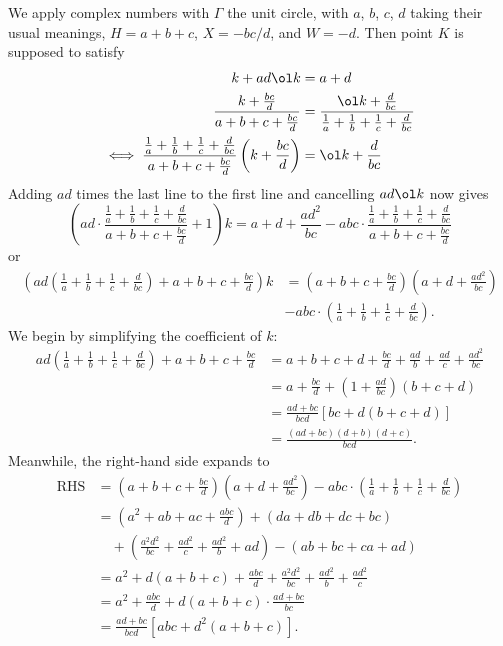 We apply complex numbers with $\Gamma$ the unit circle,
with $a$, $b$, $c$, $d$ taking their usual meanings,
$H = a+b+c$, $X = -bc/d$, and $W = -d$.
Then point $K$ is supposed to satisfy
\begin{align*}
  k + ad \ol k &= a+d \\
  \frac{k+\frac{bc}{d}}{a+b+c+\frac{bc}{d}}
    &= \frac{\ol k + \frac{d}{bc}}{\frac1a+\frac1b+\frac1c+\frac{d}{bc}} \\
  \iff \frac{\frac1a+\frac1b+\frac1c+\frac{d}{bc}}{a+b+c+\frac{bc}{d}}
    \left( k + \frac{bc}{d} \right)
  &= \ol k + \frac{d}{bc}
\end{align*}
Adding $ad$ times the last line to the first line and cancelling $ad \ol k$ now gives
\[
  \left( ad \cdot \frac{\frac1a+\frac1b+\frac1c+\frac{d}{bc}}%
    {a+b+c+\frac{bc}{d}} + 1 \right) k
  = a + d + \frac{ad^2}{bc} - abc \cdot
  \frac{\frac1a+\frac1b+\frac1c+\frac{d}{bc}}{a+b+c+\frac{bc}{d}}
\]
or
\begin{align*}
  \left( ad \left( \frac1a+\frac1b+\frac1c+\frac{d}{bc} \right)
    + a+b+c+\frac{bc}{d} \right) k
  &= \left( a+b+c+\frac{bc}{d}  \right)
  \left( a + d + \frac{ad^2}{bc} \right) \\
  &- abc \cdot \left( \frac1a+\frac1b+\frac1c+\frac{d}{bc} \right).
\end{align*}
We begin by simplifying the coefficient of $k$:
\begin{align*}
  ad \left( \frac1a+\frac1b+\frac1c+\frac{d}{bc} \right)
    + a+b+c+\frac{bc}{d}
  &= a+b+c+d + \frac{bc}{d}+\frac{ad}{b}+\frac{ad}{c} + \frac{ad^2}{bc} \\
  &= a + \frac{bc}{d} + \left( 1 + \frac{ad}{bc} \right)(b+c+d) \\
  &= \frac{ad+bc}{bcd} \left[ bc + d(b+c+d) \right] \\
  &= \frac{(ad+bc)(d+b)(d+c)}{bcd}.
\end{align*}
Meanwhile, the right-hand side expands to
\begin{align*}
  \text{RHS} &=
  \left( a+b+c+\frac{bc}{d}  \right)
  \left( a + d + \frac{ad^2}{bc} \right)
  - abc \cdot \left( \frac1a+\frac1b+\frac1c+\frac{d}{bc} \right) \\
  &= \left( a^2+ab+ac+\frac{abc}{d} \right)
  + \left( da+db+dc+bc \right) \\
  &\quad+ \left( \frac{a^2d^2}{bc} + \frac{ad^2}{c} + \frac{ad^2}{b} + ad \right)
  - \left( ab+bc+ca+ad \right) \\
  &= a^2 + d(a+b+c) + \frac{abc}{d} + \frac{a^2d^2}{bc}
  + \frac{ad^2}{b} + \frac{ad^2}{c} \\
  &= a^2 + \frac{abc}{d} + d(a+b+c) \cdot \frac{ad+bc}{bc} \\
  &= \frac{ad+bc}{bcd} \left[ abc+d^2(a+b+c) \right].
\end{align*}
